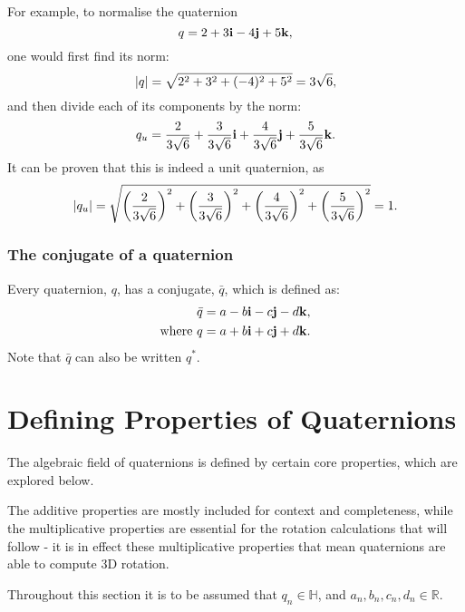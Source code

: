 \documentclass[11pt]{article}
\begin{document}
For example, to normalise the quaternion
\begin{equation}
    q = 2 + 3\vb{i} - 4\vb{j} + 5\vb{k},
\end{equation}
one would first find its norm:
\begin{equation}
    \abs{q} = \sqrt{2^2 + 3^2 + (-4)^2 + 5^2} = 3\sqrt{6},
\end{equation}
and then divide each of its components by the norm:
\begin{equation}
    q_u = \frac{2}{3\sqrt{6}}+\frac{3}{3\sqrt{6}}\vb{i}+\frac{4}{3\sqrt{6}}\vb{j}+\frac{5}{3\sqrt{6}}\vb{k}.
\end{equation}
It can be proven that this is indeed a unit quaternion, as
\begin{equation}
    \abs{q_u} = \sqrt{\left(\frac{2}{3\sqrt{6}}\right)^2+\left(\frac{3}{3\sqrt{6}}\right)^2+\left(\frac{4}{3\sqrt{6}}\right)^2+\left(\frac{5}{3\sqrt{6}}\right)^2} = 1.
\end{equation}

\subsubsection{The conjugate of a quaternion}

Every quaternion, $q$, has a conjugate, $\bar{q}$, which is defined as:
\begin{equation}
    \begin{aligned}
        &\bar{q} = a - b\vb{i} - c\vb{j} - d\vb{k}, \\
        \text{where } & q = a + b\vb{i} + c\vb{j} + d\vb{k}.
    \end{aligned}
\end{equation}
Note that $\bar{q}$ can also be written $q^*$. \cite{DRose}

\pagebreak
\section{Defining Properties of Quaternions}

The algebraic field of quaternions is defined by certain core properties, which are explored below.

The additive properties are mostly included for context and completeness, while the multiplicative properties are essential for the rotation calculations that will follow - it is in effect these multiplicative properties that mean quaternions are able to compute 3D rotation.

Throughout this section it is to be assumed that $q_n \in \mathbb{H}$, and $a_n, b_n, c_n, d_n \in \mathbb{R}$.
\end{document}
